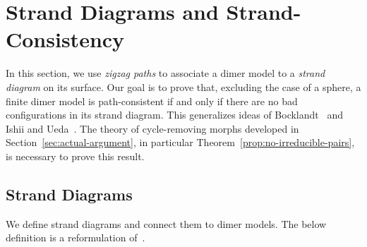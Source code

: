 \documentclass{article}
\theoremstyle{definition}
\begin{document}
\section{Strand Diagrams and Strand-Consistency}\label{sec:pdsc}


In this section, we use \textit{zigzag paths} to associate a dimer model to a \textit{strand diagram} on its surface. Our goal is to prove that, excluding the case of a sphere, a finite dimer model is path-consistent if and only if there are no bad configurations in its strand diagram. This generalizes ideas of Bocklandt~\cite{XBocklandt2011} and Ishii and Ueda~\cite{XIU}. The theory of cycle-removing morphs developed in Section~\ref{sec:actual-argument}, in particular Theorem~\ref{prop:no-irreducible-pairs}, is necessary to prove this result. 

\subsection{Strand Diagrams}

We define strand diagrams and connect them to dimer models. The below definition is a reformulation of~\cite[Definition 1.10]{XBocklandt2015}.
\end{document}
